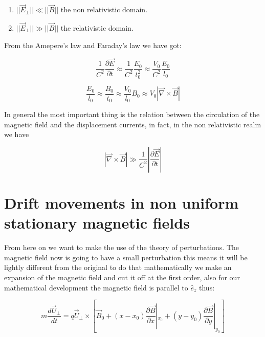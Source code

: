 \documentclass[spanish,notitlepage,letterpaper,11pt]{article} %
\numberwithin{equation}{subsection}
\begin{document}
            \begin{enumerate}
                \item $||\Vec{E}_{\perp}|| \ll ||\Vec{B}|| $ the non relativistic domain.

                \item$||\Vec{E}_{\perp}|| \gg ||\Vec{B}|| $ the relativistic domain.
            \end{enumerate}

            From the Amepere's law and Faraday's law we have got:

            \begin{equation}
                \frac{1}{C^2}\frac{\partial\Vec{E}}{\partial t} \approx \frac{1}{C^2}\frac{E_0}{t_0^2} \approx \frac{V_0}{C^2}\frac{E_0}{l_0}
            \end{equation}

            \begin{equation}
                \frac{E_0}{l_0}\approx \frac{B_0}{t_0}\approx \frac{V_0}{l_0}B_0 \approx V_0|\Vec{\nabla}\times\Vec{B}|
            \end{equation}

            In general the most important thing is the relation between the circulation of the magnetic field and the displacement currents, in fact, in the non relativistic realm we have

            \begin{equation}
                |\Vec{\nabla}\times\Vec{B}| \gg \frac{1}{C^2}\left|\frac{\partial\Vec{E}}{\partial t} \right|
            \end{equation}

    \section{Drift movements in non uniform stationary magnetic fields}

        From here on we want to make the use of the theory of perturbations. The magnetic field now is going to have a small perturbation this means it will be lightly different from the original to do that mathematically we make an expansion of the magnetic field and cut it off at the first order, also for our mathematical development the magnetic field is parallel to $\hat{e}_z$ thus:

        \begin{equation}
            m\frac{d\Vec{U}_{\perp}}{dt} = q\Vec{U}_{\perp}\times\left[\Vec{B}_0 + (x-x_0)\frac{\partial\Vec{B}}{\partial x}|_{x_0} + (y-y_0)\frac{\partial\Vec{B}}{\partial y}|_{y_0} \right]
        \end{equation}
\end{document}
